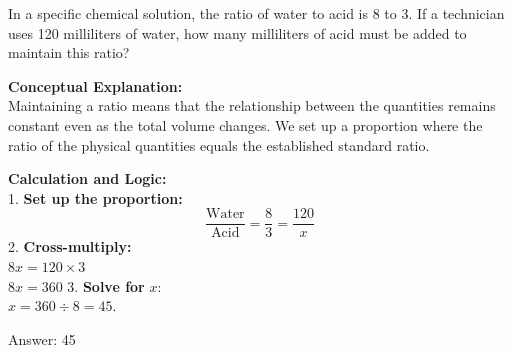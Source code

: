 \documentclass[11pt,paper=a4,answers]{exam}
\begin{document}
\begin{questions}

\question
In a specific chemical solution, the ratio of water to acid is 8 to 3. If a technician uses 120 milliliters of water, how many milliliters of acid must be added to maintain this ratio?

\begin{solution}
\textbf{Conceptual Explanation:} \\
Maintaining a ratio means that the relationship between the quantities remains constant even as the total volume changes. We set up a proportion where the ratio of the physical quantities equals the established standard ratio.

\vspace{30pt}
\begin{center}
\end{center}
\vspace{30pt}

\textbf{Calculation and Logic:} \\
1. \textbf{Set up the proportion:} \\
\[ \frac{\text{Water}}{\text{Acid}} = \frac{8}{3} = \frac{120}{x} \]
2. \textbf{Cross-multiply:} \\
$8x = 120 \times 3$ \\
$8x = 360$
3. \textbf{Solve for } $x$: \\
$x = 360 \div 8 = 45$.

\vspace{30pt}

Answer: \colorbox{yellow!100}{45}
\end{solution}


\end{questions}
\end{document}
